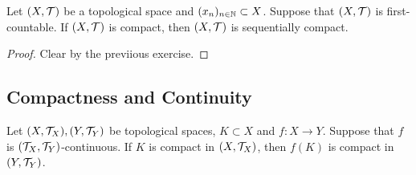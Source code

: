 \documentclass{book}
\begin{document}
 \begin{ex} 
 	Let $(X, \mathcal{T})$ be a topological space and $(x_n)_{n \in \mathbb{N}} \subset X$. Suppose that $(X, \mathcal{T})$ is first-countable. If $(X, \mathcal{T})$ is compact, then $(X, \mathcal{T})$ is sequentially compact.
 \end{ex}

\begin{proof}
	Clear by the previious exercise. 
\end{proof}
 
 
 
 
 
 
 
 
 
 
 
 
 
 
 
 
 
 
 
 
 
 
 
 
 
 
 
 
 
 
 
 
 
 
 
 
 
 \subsection{Compactness and Continuity}
 
 \begin{ex} 
 	Let $(X, \mathcal{T}_X), (Y, \mathcal{T}_Y)$ be topological spaces, $K \subset X$ and $f: X \rightarrow Y$. Suppose that $f$ is $(\mathcal{T}_X, \mathcal{T}_Y)$-continuous. If $K$ is compact in $(X, \mathcal{T}_X)$, then $f(K)$ is compact in $(Y, \mathcal{T}_Y)$.
 \end{ex}
\end{document}
